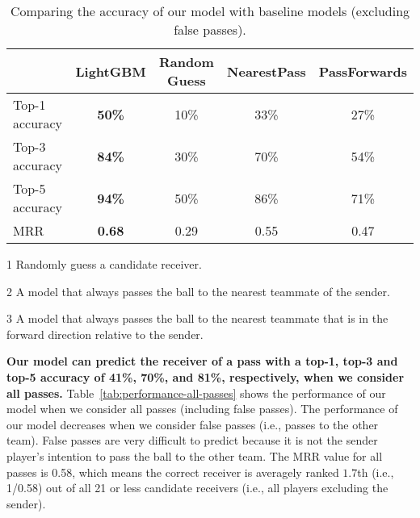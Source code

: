 \begin{table}[!t]
\caption{Comparing the accuracy of our model with baseline models (excluding false passes).}
\centering
\renewcommand{\tabcolsep}{3pt}
\begin{threeparttable}
\begin{tabular}{lcccc}
  \toprule
  & LightGBM & Random Guess\tnote{1} & NearestPass\tnote{2} & PassForwards\tnote{3} \\
  \midrule
  Top-1 accuracy & \textbf{50\%} & 10\% & 33\% & 27\% \\
  Top-3 accuracy & \textbf{84\%} & 30\% & 70\% & 54\% \\
  Top-5 accuracy & \textbf{94\%} & 50\% & 86\% & 71\% \\
  MRR & \textbf{0.68} & 0.29 & 0.55 & 0.47 \\
  \bottomrule
\end{tabular}
\begin{tablenotes}
\item[1] Randomly guess a candidate receiver.
\item[2] A model that always passes the ball to the nearest teammate of the sender.
\item[3] A model that always passes the ball to the nearest teammate that is in the forward direction relative to the sender.
\end{tablenotes}
\end{threeparttable}
\label{tab:comparing-performance-accurate-passes}
\end{table}

\textbf{Our model can predict the receiver of a pass with a top-1, top-3 and top-5 accuracy of 41\%, 70\%, and 81\%, respectively, when we consider all passes.}
Table~\ref{tab:performance-all-passes} shows the performance of our model when we consider all passes (including false passes). 
The performance of our model decreases when we consider false passes (i.e., passes to the other team). 
False passes are very difficult to predict because it is not the sender player's intention to pass the ball to the other team. 
The MRR value for all passes is 0.58, which means the correct receiver is averagely ranked $1.7$th (i.e., 1/0.58) out of all 21 or less candidate receivers (i.e., all players excluding the sender).

